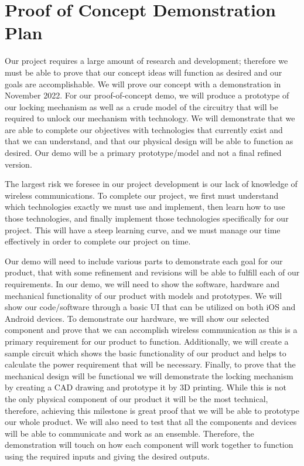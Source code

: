 \documentclass{article}
\begin{document}
\section{Proof of Concept Demonstration Plan}

Our project requires a large amount of research and development; therefore we must be able to prove that our concept ideas will function as desired and our goals are accomplishable.  We will prove our concept with a demonstration in November 2022.  For our proof-of-concept demo, we will produce a prototype of our locking mechanism as well as a crude model of the circuitry that will be required to unlock our mechanism with technology.  We will demonstrate that we are able to complete our objectives with technologies that currently exist and that we can understand, and that our physical design will be able to function as desired.  Our demo will be a primary prototype/model and not a final refined version.  

The largest risk we foresee in our project development is our lack of knowledge of wireless communications. To complete our project, we first must understand which technologies exactly we must use and implement, then learn how to use those technologies, and finally implement those technologies specifically for our project.  This will have a steep learning curve, and we must manage our time effectively in order to complete our project on time. 

Our demo will need to include various parts to demonstrate each goal for our product, that with some refinement and revisions will be able to fulfill each of our requirements. In our demo, we will need to show the software, hardware and mechanical functionality of our product with models and prototypes.  We will show our code/software through a basic UI that can be utilized on both iOS and Android devices.  To demonstrate our hardware, we will show our selected component and prove that we can accomplish wireless communication as this is a primary requirement for our product to function.  Additionally, we will create a sample circuit which shows the basic functionality of our product and helps to calculate the power requirement that will be necessary.  Finally, to prove that the mechanical design will be functional we will demonstrate the locking mechanism by creating a CAD drawing and prototype it by 3D printing.  While this is not the only physical component of our product it will be the most technical, therefore, achieving this milestone is great proof that we will be able to prototype our whole product.  We will also need to test that all the components and devices will be able to communicate and work as an ensemble.  Therefore, the demonstration will touch on how each component will work together to function using the required inputs and giving the desired outputs.
\end{document}
